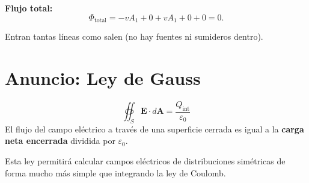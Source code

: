 \documentclass[12pt,a4paper]{article}
\begin{document}
\textbf{Flujo total:}
\[
\Phi_{\text{total}} = -v A_1 + 0 + v A_1 + 0 + 0 = 0 .
\]

Entran tantas líneas como salen (no hay fuentes ni sumideros dentro).

\section{Anuncio: Ley de Gauss}

\begin{keybox}
  \[
  \boxed{\oiint_S \mathbf{E} \cdot d\mathbf{A}
         = \frac{Q_{\text{int}}}{\varepsilon_0}}
  \]
  El flujo del campo eléctrico a través de una superficie cerrada es
  igual a la \textbf{carga neta encerrada} dividida por
  $\varepsilon_0$.
\end{keybox}

Esta ley permitirá calcular campos eléctricos de distribuciones
simétricas de forma mucho más simple que integrando la ley de Coulomb.
\end{document}
